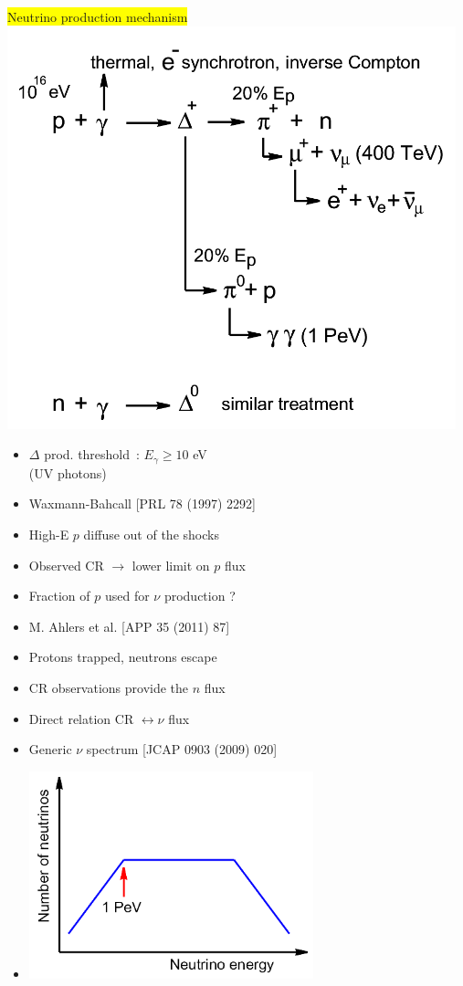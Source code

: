 \Tr
\twocolumn
\begin{center}
\colorbox{yellow}{Neutrino production mechanism}\\
\includegraphics[keepaspectratio,width=13cm]{grb-engine2}
\end{center}
%
\begin{itemize}
\item $\Delta$ prod. threshold~: $E_{\gamma} \ge 10$ eV\\
      (UV photons)
\end{itemize}

\newpage
%
\begin{itemize}
\item {\red Waxmann-Bahcall} {\large [PRL 78 (1997) 2292]}
\item[] High-E $p$ diffuse out of the shocks
\item[] Observed CR $\rightarrow$ lower limit on $p$ flux 
\item[] {\blue Fraction of $p$ used for $\nu$ production ?}
\item {\red M. Ahlers et al.} {\large [APP 35 (2011) 87]}
\item[] Protons trapped, neutrons escape
\item[] CR observations provide the $n$ flux
\item[] {\blue Direct relation CR $\leftrightarrow \nu$ flux}
\item {\red Generic $\nu$ spectrum} {\large [JCAP 0903 (2009) 020]}
\item[] \includegraphics[keepaspectratio,height=6cm]{wb-spectrum}
\end{itemize}

